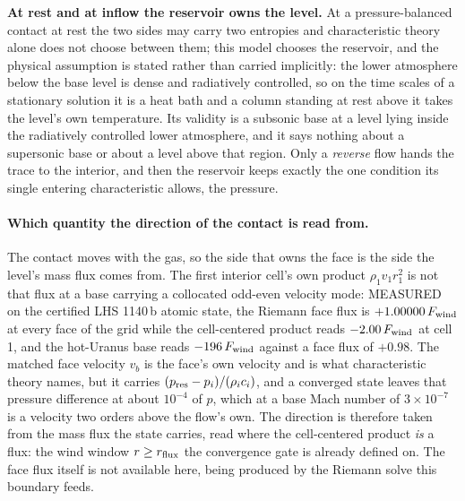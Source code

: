 \textbf{At rest and at inflow the reservoir owns the level.}  At a
pressure-balanced contact at rest the two sides may carry two entropies and
characteristic theory alone does not choose between them; this model chooses
the reservoir, and the physical assumption is stated rather than carried
implicitly: the lower atmosphere below the base level is dense and
radiatively controlled, so on the time scales of a stationary solution it is
a heat bath and a column standing at rest above it takes the level's own
temperature.  Its validity is a subsonic base at a level lying inside the
radiatively controlled lower atmosphere, and it says nothing about a
supersonic base or about a level above that region.  Only a \emph{reverse}
flow hands the trace to the interior, and then the reservoir keeps exactly
the one condition its single entering characteristic allows, the pressure.

\paragraph{Which quantity the direction of the contact is read from.}
The contact moves with the gas, so the side that owns the face is the side
the level's mass flux comes from.  The first interior cell's own product
$\rho_1v_1r_1^2$ is not that flux at a base carrying a collocated odd-even
velocity mode: MEASURED on the certified LHS 1140\,b atomic state, the
Riemann face flux is $+1.00000\,F_{\rm wind}$ at every face of the grid while
the cell-centered product reads $-2.00\,F_{\rm wind}$ at cell 1, and the
hot-Uranus base reads $-196\,F_{\rm wind}$ against a face flux of $+0.98$.
The matched face velocity $v_b$ is the face's own velocity and is what
characteristic theory names, but it carries $(p_{\rm res}-p_i)/(\rho_ic_i)$,
and a converged state leaves that pressure difference at about $10^{-4}$ of
$p$, which at a base Mach number of $3\times10^{-7}$ is a velocity two orders
above the flow's own.  The direction is therefore taken from the mass flux
the state carries, read where the cell-centered product \emph{is} a flux:
the wind window $r \ge r_{\rm flux}$ the convergence gate is already defined
on.  The face flux itself is not available here, being produced by the
Riemann solve this boundary feeds.

